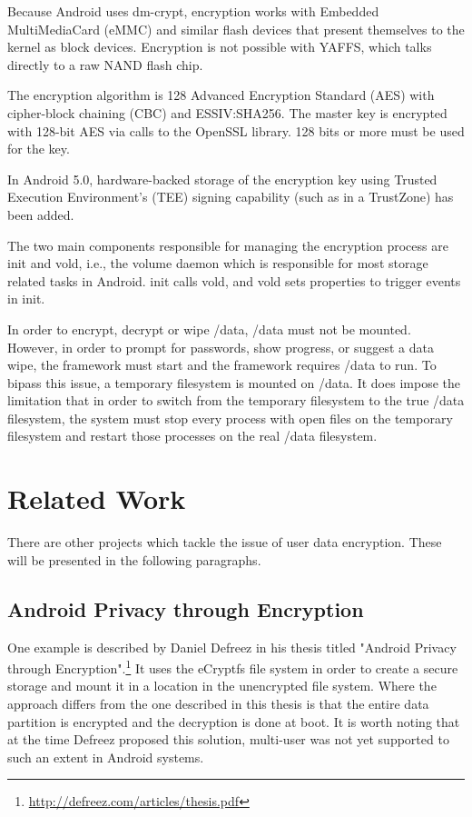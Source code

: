 Because Android uses dm-crypt, encryption works with Embedded MultiMediaCard (eMMC) and similar flash devices that present themselves to the kernel as block devices. Encryption is not possible with YAFFS, which talks directly to a raw NAND flash chip.

The encryption algorithm is 128 Advanced Encryption Standard (AES) with cipher-block chaining (CBC) and ESSIV:SHA256. The master key is encrypted with 128-bit AES via calls to the OpenSSL library. 128 bits or more must be used for the key.

In Android 5.0, hardware-backed storage of the encryption key using Trusted Execution Environment’s (TEE) signing capability (such as in a TrustZone) has been added.

The two main components responsible for managing the encryption process are init and vold, i.e., the volume daemon which is responsible for most storage related tasks in Android. init calls vold, and vold sets properties to trigger events in init.

In order to encrypt, decrypt or wipe /data, /data must not be mounted. However, in order to prompt for passwords, show progress, or suggest a data wipe, the framework must start and the framework requires /data to run. To bipass this issue, a temporary filesystem is mounted on /data. It does impose the limitation that in order to switch from the temporary filesystem to the true /data filesystem, the system must stop every process with open files on the temporary filesystem and restart those processes on the real /data filesystem. 

\newpage
\section{Related Work}
\label{sec:related-work}

There are other projects which tackle the issue of user data encryption. These will be presented in the following paragraphs.

\subsection{Android Privacy through Encryption}
\label{sub-sec:and-priv-defreez}

One example is described by Daniel Defreez in his thesis titled "Android Privacy through Encryption".\footnote{\url{http://defreez.com/articles/thesis.pdf}}
It uses the eCryptfs file system in order to create a secure storage and mount it in a location in the unencrypted file system. Where the approach differs from the one described in this thesis is that the entire data partition is encrypted and the decryption is done at boot. It is worth noting that at the time Defreez proposed this solution, multi-user was not yet supported to such an extent in Android systems.

